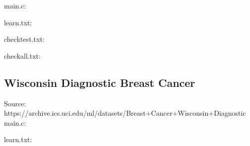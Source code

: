 main.c:\\
\begin{scriptsize}
\begin{ttfamily}

\end{ttfamily}
\end{scriptsize}

learn.txt:\\
\begin{scriptsize}
\begin{ttfamily}

\end{ttfamily}
\end{scriptsize}

checktest.txt:\\
\begin{scriptsize}
\begin{ttfamily}

\end{ttfamily}
\end{scriptsize}

checkall.txt:\\
\begin{scriptsize}
\begin{ttfamily}

\end{ttfamily}
\end{scriptsize}

\subsection{Wisconsin Diagnostic Breast Cancer}

Source: https://archive.ics.uci.edu/ml/datasets/Breast+Cancer+Wisconsin+Diagnostic \\

main.c:\\
\begin{scriptsize}
\begin{ttfamily}

\end{ttfamily}
\end{scriptsize}

learn.txt:\\
\begin{scriptsize}
\begin{ttfamily}

\end{ttfamily}
\end{scriptsize}


